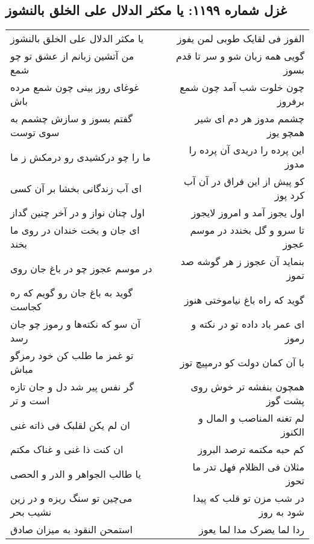 \begin{center}
\section*{غزل شماره ۱۱۹۹: یا مکثر الدلال علی الخلق بالنشوز}
\label{sec:1199}
\begin{longtable}{l p{0.5cm} r}
یا مکثر الدلال علی الخلق بالنشوز
&&
الفوز فی لقایک طوبی لمن یفوز
\\
من آتشین زبانم از عشق تو چو شمع
&&
گویی همه زبان شو و سر تا قدم بسوز
\\
غوغای روز بینی چون شمع مرده باش
&&
چون خلوت شب آمد چون شمع برفروز
\\
گفتم بسوز و سازش چشمم به سوی توست
&&
چشمم مدوز هر دم ای شیر همچو یوز
\\
ما را چو درکشیدی رو درمکش ز ما
&&
این پرده را دریدی آن پرده را مدوز
\\
ای آب زندگانی بخشا بر آن کسی
&&
کو پیش از این فراق در آن آب کرد پوز
\\
اول چنان نواز و در آخر چنین گداز
&&
اول یجوز آمد و امروز لایجوز
\\
ای جان و بخت خندان در روی ما بخند
&&
تا سرو و گل بخندد در موسم عجوز
\\
در موسم عجوز چو در باغ جان روی
&&
بنماید آن عجوز ز هر گوشه صد تموز
\\
گوید به باغ جان رو گویم که ره کجاست
&&
گوید که راه باغ نیاموختی هنوز
\\
آن سو که نکته‌ها و رموز چو جان رسد
&&
ای عمر باد داده تو در نکته و رموز
\\
تو غمز ما طلب کن خود رمزگو مباش
&&
با آن کمان دولت کو درمپیچ توز
\\
گر نفس پیر شد دل و جان تازه است و تر
&&
همچون بنفشه تر خوش روی پشت گوز
\\
ان لم یکن لقلبک فی ذاته غنی
&&
لم تغنه المناصب و المال و الکنوز
\\
ان کنت ذا غنی و غناک مکتم
&&
کم حبه مکتمه ترصد البروز
\\
یا طالب الجواهر و الدر و الحصی
&&
مثلان فی الظلام فهل تدر ما تحوز
\\
می‌چین تو سنگ ریزه و در زین نشیب بحر
&&
در شب مزن تو قلب که پیدا شود به روز
\\
استمحن النقود به میزان صادق
&&
ردا لما یضرک مدا لما یعوز
\\
\end{longtable}
\end{center}
